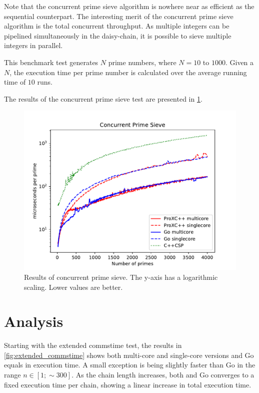 Note that the concurrent prime sieve algorithm is nowhere near as efficient as the sequential counterpart. The interesting merit of the concurrent prime sieve algorithm is the total concurrent throughput. As multiple integers can be pipelined simultaneously in the daisy\hyp{}chain, it is possible to sieve multiple integers in parallel.

This benchmark test generates $N$ prime numbers, where $N=10$ to $1000$. Given a $N$, the execution time per prime number is calculated over the average running time of $10$ runs.

The results of the concurrent prime sieve test are presented in \cref{fig:concurrent_sieve}.

\begin{figure}[h!]
    \centering
    \includegraphics[width=0.9\linewidth]{fig/concurrent_sieve}
    \caption{Results of concurrent prime sieve. The y\hyp{}axis has a logarithmic scaling. Lower values are better.}
    \label{fig:concurrent_sieve}
\end{figure}


\FloatBarrier
\section{Analysis}
\label{sec:analysis}


Starting with the extended commstime test, the results in \cref{fig:extended_commstime} shows both multi\hyp{}core and single\hyp{}core versions \Proxc{} and Go equals in execution time. A small exception is \Proxc{} being slightly faster than Go in the range $n\in[1;\sim{}300]$. As the chain length increases, both \Proxc{} and Go converges to a fixed execution time per chain, showing a linear increase in total execution time. 

